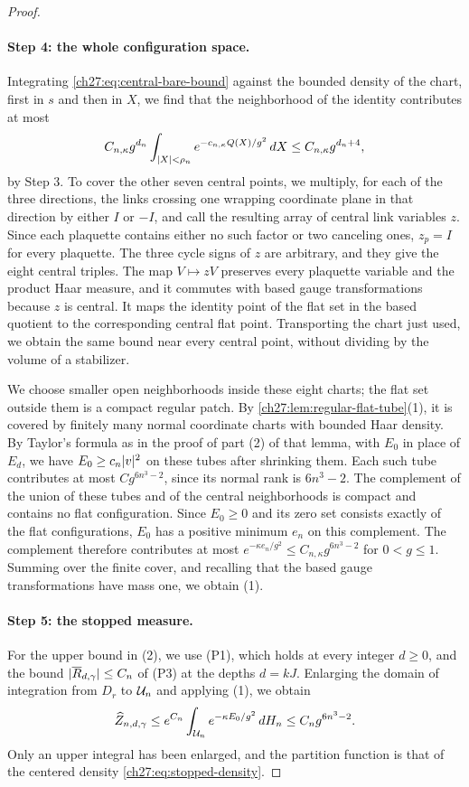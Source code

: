 \begin{proof}
\paragraph{Step 4: the whole configuration space.}
Integrating \eqref{ch27:eq:central-bare-bound} against the bounded density of the chart, first in $s$ and then in $X$, we find that the neighborhood of the identity contributes at most
\[
 C_{n,\kappa}g^{d_n}\int_{\lvert X\rvert<\rho_n}e^{-c_{n,\kappa}Q(X)/g^2}\,dX\le C_{n,\kappa}g^{d_n+4},
\]
by Step 3. To cover the other seven central points, we multiply, for each of the three directions, the links crossing one wrapping coordinate plane in that direction by either $I$ or $-I$, and call the resulting array of central link variables $z$. Since each plaquette contains either no such factor or two canceling ones, $z_p=I$ for every plaquette. The three cycle signs of $z$ are arbitrary, and they give the eight central triples. The map $V\mapsto zV$ preserves every plaquette variable and the product Haar measure, and it commutes with based gauge transformations because $z$ is central. It maps the identity point of the flat set in the based quotient to the corresponding central flat point. Transporting the chart just used, we obtain the same bound near every central point, without dividing by the volume of a stabilizer.

We choose smaller open neighborhoods inside these eight charts; the flat set outside them is a compact regular patch. By \cref{ch27:lem:regular-flat-tube}(1), it is covered by finitely many normal coordinate charts with bounded Haar density. By Taylor's formula as in the proof of part (2) of that lemma, with $E_0$ in place of $E_d$, we have $E_0\ge c_n\lvert v\rvert^2$ on these tubes after shrinking them. Each such tube contributes at most $Cg^{6n^3-2}$, since its normal rank is $6n^3-2$. The complement of the union of these tubes and of the central neighborhoods is compact and contains no flat configuration. Since $E_0\ge0$ and its zero set consists exactly of the flat configurations, $E_0$ has a positive minimum $e_n$ on this complement. The complement therefore contributes at most $e^{-\kappa e_n/g^2}\le C_{n,\kappa}g^{6n^3-2}$ for $0<g\le1$. Summing over the finite cover, and recalling that the based gauge transformations have mass one, we obtain (1).

\paragraph{Step 5: the stopped measure.}
For the upper bound in (2), we use (P1), which holds at every integer $d\ge0$, and the bound $\lvert \overline R_{d,\gamma}\rvert\le C_n$ of (P3) at the depths $d=kJ$. Enlarging the domain of integration from $D_r$ to $\mathcal U_{n}$ and applying (1), we obtain
\[
 \widehat Z_{n,d,\gamma}\le e^{C_n}\int_{\mathcal U_{n}}e^{-\kappa E_0/g^2}\,dH_n\le C_ng^{6n^3-2}.
\]
Only an upper integral has been enlarged, and the partition function is that of the centered density \eqref{ch27:eq:stopped-density}.


\end{proof}
